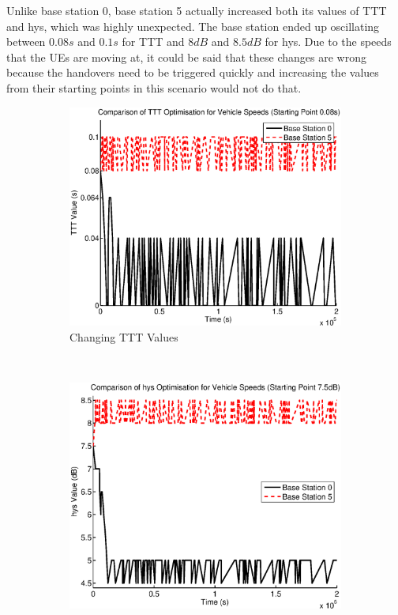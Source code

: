Unlike base station 0, base station 5 actually increased both its values of TTT and hys, which was highly unexpected. The base station ended up oscillating between $0.08 s$ and $0.1 s$ for TTT and $8 dB$ and $8.5 dB$ for hys. Due to the speeds that the UEs are moving at, it could be said that these changes are wrong because the handovers need to be triggered quickly and increasing the values from their starting points in this scenario would not do that.
\begin{figure}[H]
        \centering
        \begin{subfigure}[b]{0.49\textwidth}
                \includegraphics[width=\textwidth]{figures/vehicle_figures/highhys/long_ttt.eps}
                \caption{Changing TTT Values}
                \label{fig:veh_highhys_ttt}
        \end{subfigure}%
        ~ %
        \begin{subfigure}[b]{0.49\textwidth}
                \includegraphics[width=\textwidth]{figures/vehicle_figures/highhys/long_hys.eps}

\end{subfigure}
\end{figure}
